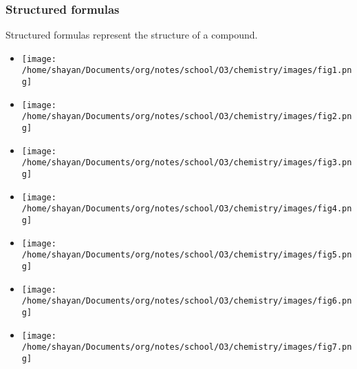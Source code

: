 \documentclass[11pt]{article}
\begin{document}
\subsubsection{Structured formulas}
\label{sec:org56c2cfd}
Structured formulas represent the structure of a compound.
\begin{itemize}
\item \begin{center}
\texttt{[image: /home/shayan/Documents/org/notes/school/O3/chemistry/images/fig1.png]}
\end{center}
\item \begin{center}
\texttt{[image: /home/shayan/Documents/org/notes/school/O3/chemistry/images/fig2.png]}
\end{center}
\item \begin{center}
\texttt{[image: /home/shayan/Documents/org/notes/school/O3/chemistry/images/fig3.png]}
\end{center}
\item \begin{center}
\texttt{[image: /home/shayan/Documents/org/notes/school/O3/chemistry/images/fig4.png]}
\end{center}
\item \begin{center}
\texttt{[image: /home/shayan/Documents/org/notes/school/O3/chemistry/images/fig5.png]}
\end{center}
\item \begin{center}
\texttt{[image: /home/shayan/Documents/org/notes/school/O3/chemistry/images/fig6.png]}
\end{center}
\item \begin{center}
\texttt{[image: /home/shayan/Documents/org/notes/school/O3/chemistry/images/fig7.png]}
\end{center}
\end{itemize}
\end{document}
